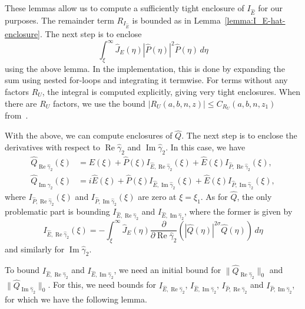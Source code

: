\documentclass[11pt]{article}
\DeclareMathOperator{\real}{Re}
\DeclareMathOperator{\imag}{Im}
\begin{document}
These lemmas allow us to compute a sufficiently tight enclosure of
\(I_{\hat{E}}\) for our purposes. The remainder term
\(R_{I_{\hat{E}}}\) is bounded as in
Lemma~\ref{lemma:I_E-hat-enclosure}. The next step is to enclose
\begin{equation*}
  \int_{\xi}^{\infty} \hat{J}_{E}(\eta)|\hat{P}(\eta)|^{2}\hat{P}(\eta)\,d\eta
\end{equation*}
using the above lemma. In the implementation, this is done by
expanding the sum using nested for-loops and integrating it termwise.
For terms without any factors \(R_{U}\), the integral is computed
explicitly, giving very tight enclosures. When there are \(R_{U}\)
factors, we use the bound
\(|R_{U}(a, b, n, z)| \leq C_{R_{U}}(a, b, n, z_{1})\)
from~\cite[Lemma~7.1]{Dahne2024}.

With the above, we can compute enclosures of \(\hat{Q}\). The next
step is to enclose the derivatives with respect to
\(\real\hat{\gamma}_{2}\) and \(\imag\hat{\gamma}_{2}\). In this case,
we have
\begin{align*}
  \hat{Q}_{\real\hat{\gamma}_{2}}(\xi)
  &= \hat{E}(\xi)
    + \hat{P}(\xi)I_{\hat{E},\real\hat{\gamma}_{2}}(\xi)
    + \hat{E}(\xi)I_{\hat{P},\real\hat{\gamma}_{2}}(\xi),\\
  \hat{Q}_{\imag\hat{\gamma}_{2}}(\xi)
  &= i\hat{E}(\xi)
    + \hat{P}(\xi)I_{\hat{E},\imag\hat{\gamma}_{2}}(\xi)
    + \hat{E}(\xi)I_{\hat{P},\imag\hat{\gamma}_{2}}(\xi),
\end{align*}
where \(I_{\hat{P},\real\hat{\gamma}_{2}}(\xi)\) and
\(I_{\hat{P},\imag\hat{\gamma}_{2}}(\xi)\) are zero at
\(\xi = \xi_{1}\). As for \(\hat{Q}\), the only problematic part is
bounding \(I_{\hat{E},\real\hat{\gamma}_{2}}\) and
\(I_{\hat{E},\imag\hat{\gamma}_{2}}\), where the former is given by
\begin{equation*}
  I_{\hat{E},\real\hat{\gamma}_{2}}(\xi) = -\int_{\xi}^{\infty} \hat{J}_{E}(\eta)\frac{\partial}{\partial \real\hat{\gamma}_{2}}\left(|\hat{Q}(\eta)|^{2\sigma}\hat{Q}(\eta)\right)\,d\eta
\end{equation*}
and similarly for \(\imag\hat{\gamma}_{2}\).

To bound \(I_{\hat{E},\real\hat{\gamma}_{2}}\) and
\(I_{\hat{E},\imag\hat{\gamma}_{2}}\), we need an initial bound for
\(\|\hat{Q}_{\real\hat{\gamma}_{2}}\|_{0}\) and
\(\|\hat{Q}_{\imag\hat{\gamma}_{2}}\|_{0}\). For this, we need bounds
for \(I_{\hat{E},\real\hat{\gamma}_{2}}\),
\(I_{\hat{E},\imag\hat{\gamma}_{2}}\),
\(I_{\hat{P},\real\hat{\gamma}_{2}}\) and
\(I_{\hat{P},\imag\hat{\gamma}_{2}}\), for which we have the following
lemma.
\end{document}
